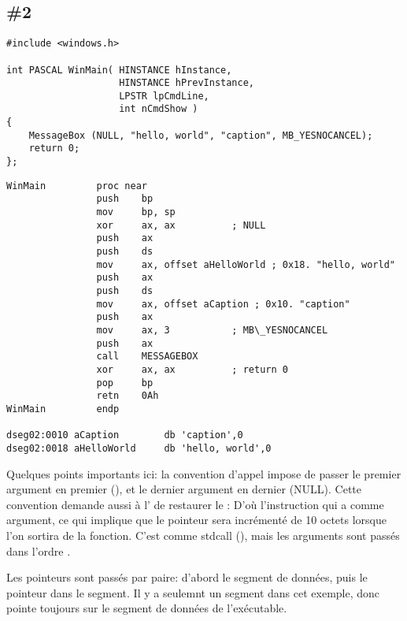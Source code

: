 \subsection{\Example{} \#2}
\label{win16_messagebox}

\begin{lstlisting}[style=customc]
#include <windows.h>

int PASCAL WinMain( HINSTANCE hInstance,
                    HINSTANCE hPrevInstance,
                    LPSTR lpCmdLine,
                    int nCmdShow )
{
	MessageBox (NULL, "hello, world", "caption", MB_YESNOCANCEL);
	return 0;
};
\end{lstlisting}

\begin{lstlisting}[style=customasmx86]
WinMain         proc near
                push    bp
                mov     bp, sp
                xor     ax, ax          ; NULL
                push    ax
                push    ds
                mov     ax, offset aHelloWorld ; 0x18. "hello, world"
                push    ax
                push    ds
                mov     ax, offset aCaption ; 0x10. "caption"
                push    ax
                mov     ax, 3           ; MB\_YESNOCANCEL
                push    ax
                call    MESSAGEBOX
                xor     ax, ax          ; return 0
                pop     bp
                retn    0Ah
WinMain         endp

dseg02:0010 aCaption        db 'caption',0
dseg02:0018 aHelloWorld     db 'hello, world',0
\end{lstlisting}

Quelques points importants ici: la convention d'appel  impose de passer
le premier argument en premier (), et le dernier argument\EMDASH{}
en dernier (NULL).
Cette convention demande aussi à l' de restaurer le :
D'où l'instruction  qui a  comme argument, ce qui implique que le
pointeur sera incrémenté de 10 octets lorsque l'on sortira de la fonction.
C'est comme stdcall (), mais les arguments sont passés dans l'ordre
.

Les pointeurs sont passés par paire: d'abord le segment de données, puis le pointeur
dans le segment.
Il y a seulemnt un segment dans cet exemple, donc  pointe toujours sur le segment
de données de l'exécutable.
